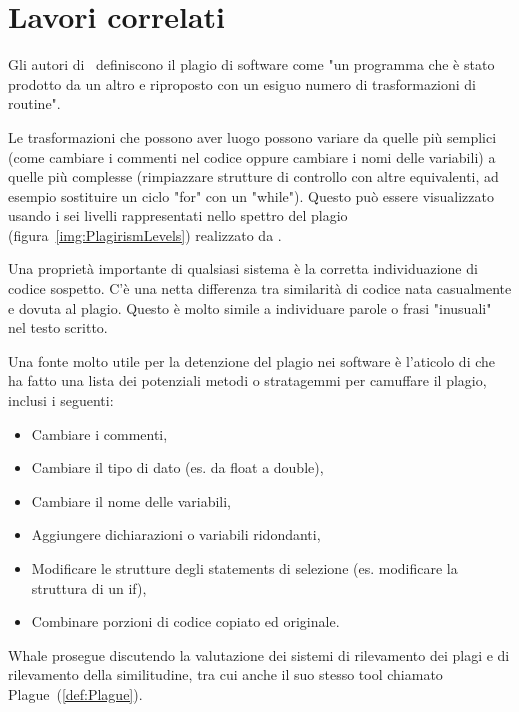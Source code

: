 \chapter{Lavori correlati}\label{def:PlagiarismDetection}
	Gli autori di~\citep{Parker1989} definiscono il plagio di software come "un programma che è stato prodotto da un altro e riproposto con un esiguo numero di trasformazioni di routine".
	
	Le trasformazioni che possono aver luogo possono variare da quelle più semplici (come cambiare i commenti nel codice oppure cambiare i nomi delle variabili) a quelle più complesse (rimpiazzare strutture di controllo con altre equivalenti, ad esempio sostituire un ciclo "for" con un "while"). Questo può essere visualizzato usando i sei livelli rappresentati nello spettro del plagio (figura~\ref{img:PlagirismLevels}) realizzato da \citep{Faidhi1987}.
	
	Una proprietà importante di qualsiasi sistema è la corretta individuazione di codice sospetto. 
	C'è una netta differenza tra similarità di codice nata casualmente e dovuta al plagio. 
	Questo è molto simile a individuare parole o frasi "inusuali" nel testo scritto. 
	
	\begin{center}
		\label{img:PlagirismLevels}
	\end{center}

	Una fonte molto utile per la detenzione del plagio nei software è l'aticolo di \citep{Whale1990} che ha fatto una lista dei potenziali metodi o stratagemmi per camuffare il plagio, inclusi i seguenti:
	\begin{itemize}
		\item Cambiare i commenti,
		\item Cambiare il tipo di dato (es. da float a double),
		\item Cambiare il nome delle variabili,
		\item Aggiungere dichiarazioni o variabili ridondanti,
		\item Modificare le strutture degli statements di selezione (es. modificare la struttura di un if),
		\item Combinare porzioni di codice copiato ed originale.
	\end{itemize}

	Whale prosegue discutendo la valutazione dei sistemi di rilevamento dei plagi e di rilevamento della similitudine, tra cui anche il suo stesso tool chiamato Plague~(\ref{def:Plague}).

